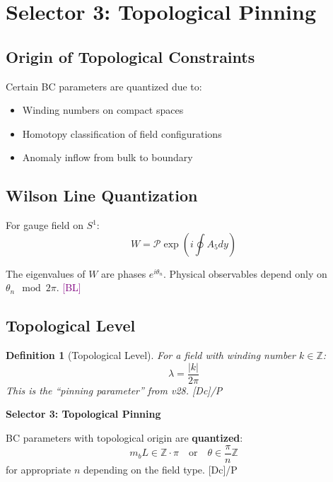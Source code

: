 \documentclass[11pt,a4paper]{article}
\newtheorem{definition}[theorem]{Definition}
\newcommand{\tagDc}{\textcolor{blue!50!black}{[Dc]}}
\newcommand{\tagBL}{\textcolor{purple}{[BL]}}
\begin{document}
\section{Selector 3: Topological Pinning}

\subsection{Origin of Topological Constraints}

Certain BC parameters are quantized due to:
\begin{itemize}
    \item Winding numbers on compact spaces
    \item Homotopy classification of field configurations
    \item Anomaly inflow from bulk to boundary
\end{itemize}

\subsection{Wilson Line Quantization}

For gauge field on $S^1$:
\begin{equation}
\label{eq:wilson}
W = \mathcal{P} \exp\left(i \oint A_5 dy\right)
\end{equation}

The eigenvalues of $W$ are phases $e^{i\theta_n}$. Physical observables depend
only on $\theta_n \mod 2\pi$. \tagBL

\subsection{Topological Level}

\begin{definition}[Topological Level]
\label{def:level}
For a field with winding number $k \in \mathbb{Z}$:
\begin{equation}
\label{eq:level}
\lambda = \frac{|k|}{2\pi}
\end{equation}
This is the ``pinning parameter'' from v28. \tagDc/P
\end{definition}

\begin{selectorbox}
\textbf{Selector 3: Topological Pinning}

BC parameters with topological origin are \textbf{quantized}:
\begin{equation}
\label{eq:topo-selector}
\boxed{m_b L \in \mathbb{Z} \cdot \pi \quad \text{or} \quad \theta \in \frac{\pi}{n} \mathbb{Z}}
\end{equation}
for appropriate $n$ depending on the field type. \tagDc/P
\end{selectorbox}
\end{document}
